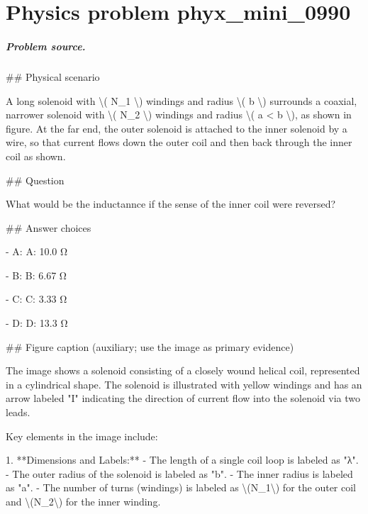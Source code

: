 
\chapter{Physics problem phyx\_mini\_0990}
\label{ch:PhyXMiniProblems_problem_phyx_mini_0990}

\paragraph{Problem source.}
\#\# Physical scenario

A long solenoid with \textbackslash{}( N\_1 \textbackslash{}) windings and radius \textbackslash{}( b \textbackslash{}) surrounds a coaxial, narrower solenoid with \textbackslash{}( N\_2 \textbackslash{}) windings and radius \textbackslash{}( a < b \textbackslash{}), as shown in figure. At the far end, the outer solenoid is attached to the inner solenoid by a wire, so that current flows down the outer coil and then back through the inner coil as shown.

\#\# Question

What would be the inductannce if the sense of the inner coil were reversed?

\#\# Answer choices

- A: A: 10.0 Ω

- B: B: 6.67 Ω

- C: C: 3.33 Ω

- D: D: 13.3 Ω

\#\# Figure caption (auxiliary; use the image as primary evidence)

The image shows a solenoid consisting of a closely wound helical coil, represented in a cylindrical shape. The solenoid is illustrated with yellow windings and has an arrow labeled "I" indicating the direction of current flow into the solenoid via two leads. 

Key elements in the image include:

1. **Dimensions and Labels:**
   - The length of a single coil loop is labeled as "λ".
   - The outer radius of the solenoid is labeled as "b".
   - The inner radius is labeled as "a".
   - The number of turns (windings) is labeled as \textbackslash{}(N\_1\textbackslash{}) for the outer coil and \textbackslash{}(N\_2\textbackslash{}) for the inner winding.

